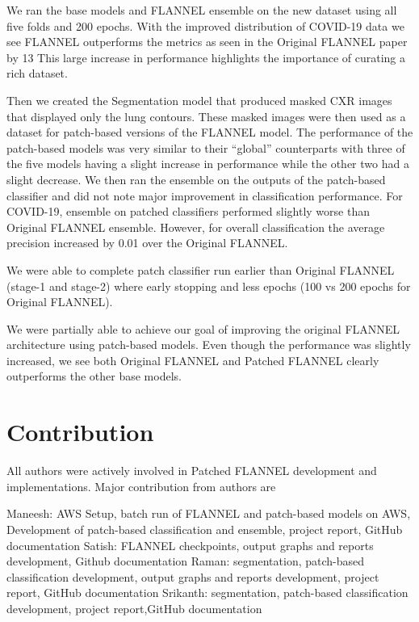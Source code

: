 \documentclass{sigkddExp}
\begin{document}
We ran the base models and FLANNEL ensemble on the new dataset using all five
folds and 200 epochs. With the improved distribution of COVID-19 data we see
FLANNEL outperforms the metrics as seen in the Original FLANNEL paper by 13%
This large increase in performance highlights the importance of curating a rich
dataset.

Then we created the Segmentation model that produced masked CXR images that
displayed only the lung contours. These masked images were then used as a
dataset for patch-based versions of the FLANNEL model. The performance of the
patch-based models was very similar to their “global” counterparts with three of
the five models having a slight increase in performance while the other two had
a slight decrease. We then ran the ensemble on the outputs of the patch-based
classifier and did not note major improvement in classification performance. For
COVID-19, ensemble on patched classifiers performed slightly worse than Original
FLANNEL ensemble. However, for overall classification the average precision
increased by 0.01 over the Original FLANNEL.

We were able to complete patch classifier run earlier than Original FLANNEL
(stage-1 and stage-2) where early stopping and less epochs (100 vs 200 epochs
for Original FLANNEL).

We were partially able to achieve our goal of improving the original FLANNEL
architecture using patch-based models. Even though the performance was slightly
increased, we see both Original FLANNEL and Patched FLANNEL clearly outperforms
the other base models.



\section{Contribution}

All authors were actively involved in Patched FLANNEL development and implementations. Major contribution from authors are

Maneesh: AWS Setup, batch run of FLANNEL and patch-based models on AWS, Development of patch-based classification and ensemble, project report, GitHub documentation
Satish: FLANNEL checkpoints, output graphs and reports development, Github documentation
Raman: segmentation, patch-based classification development, output graphs and reports development, project report, GitHub documentation
Srikanth:  segmentation, patch-based classification development, project report,GitHub documentation
\end{document}
